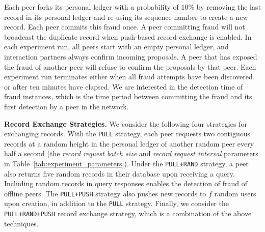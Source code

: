 Each peer forks its personal ledger with a probability of 10\% by removing the last record in its personal ledger and re-using its sequence number to create a new record.
Each peer commits this fraud once.
A peer committing fraud will not broadcast the duplicate record when push-based record exchange is enabled.
In each experiment run, all peers start with an empty personal ledger, and interaction partners always confirm incoming proposals.
A peer that has exposed the fraud of another peer will refuse to confirm the proposals by that peer.
Each experiment run terminates either when all fraud attempts have been discovered or after ten minutes have elapsed.
We are interested in the detection time of fraud instances, which is the time period between committing the fraud and its first detection by a peer in the network.

\textbf{Record Exchange Strategies.}
We consider the following four strategies for exchanging records.
With the \texttt{PULL} strategy, each peer requests two contiguous records at a random height in the personal ledger of another random peer every half a second (the \emph{record request batch size} and \emph{record request interval} parameters in Table~\ref{tab:experiment_parameters}).
Under the \texttt{PULL+RAND} strategy, a peer also returns five random records in their database upon receiving a query.
Including random records in query responses enables the detection of fraud of offline peers.
The \texttt{PULL+PUSH} strategy also pushes new records to $ f $ random users upon creation, in addition to the \texttt{PULL} strategy.
Finally, we consider the \texttt{PULL+RAND+PUSH} record exchange strategy, which is a combination of the above techniques.

